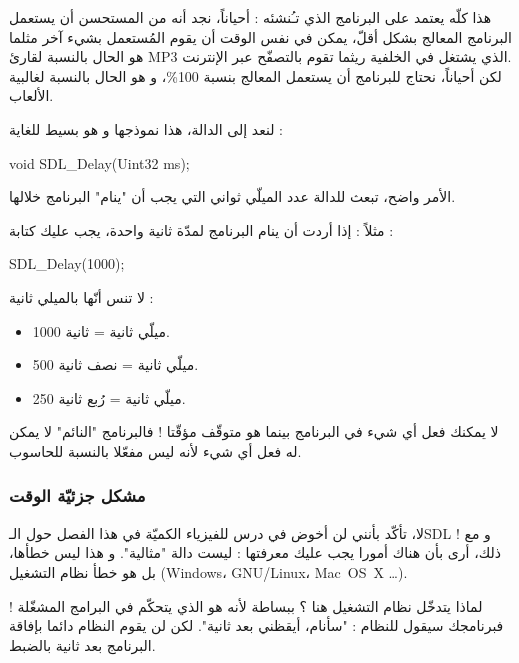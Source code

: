 \begin{information}
هذا كلّه يعتمد على البرنامج الذي تـُنشئه : أحياناً، نجد أنه من المستحسن أن يستعمل البرنامج المعالج بشكل أقلّ، يمكن في نفس الوقت أن يقوم المُستعمل بشيء آخر مثلما هو الحال بالنسبة لقارئ
\textenglish{MP3}
الذي يشتغل في الخلفية ريثما تقوم بالتصفّح عبر الإنترنت.\\
لكن أحياناً، نحتاج للبرنامج أن يستعمل المعالج بنسبة 100\%، و هو الحال بالنسبة لغالبية الألعاب.
\end{information}

لنعد إلى الدالة، هذا نموذجها و هو بسيط للغاية :

\begin{Csource}
void SDL_Delay(Uint32 ms);
\end{Csource}

الأمر واضح، تبعث للدالة عدد الميلّي ثواني التي يجب أن "ينام" البرنامج خلالها. 

مثلاً : إذا أردت أن ينام البرنامج لمدّة ثانية واحدة، يجب عليك كتابة :

\begin{Csource}
SDL_Delay(1000);
\end{Csource}

 
لا تنس أنّها بالميلي ثانية :

\begin{itemize}
	\item 1000 ميلّي ثانية = ثانية.
	\item 500 ميلّي ثانية = نصف ثانية.
	\item 250 ميلّي ثانية = رُبع ثانية.
\end{itemize}

\begin{warning}
لا يمكنك فعل أي شيء في البرنامج بينما هو متوقّف مؤقّتا ! فالبرنامج "النائم" لا يمكن له فعل أي شيء لأنه ليس مفعّلا بالنسبة للحاسوب.
\end{warning}

\subsubsection{مشكل جزئيّة الوقت}

لا، تأكّد بأنني لن أخوض في درس للفيزياء الكميّة في هذا الفصل حول الـ\textenglish{SDL} !
و مع ذلك، أرى بأن هناك أمورا يجب عليك معرفتها : 
ليست دالة "مثالية". و هذا ليس خطأها، بل هو خطأ نظام التشغيل 
(\textenglish{Windows}، \mbox{\textenglish{GNU/Linux}}، \mbox{\textenglish{Mac OS X}} \dots).

لماذا يتدخّل نظام التشغيل هنا ؟ ببساطة لأنه هو الذي يتحكّم في البرامج المشغّلة ! فبرنامجك سيقول للنظام : "سأنام، أيقظني بعد ثانية". لكن لن يقوم النظام دائما بإفاقة البرنامج بعد ثانية بالضبط.

